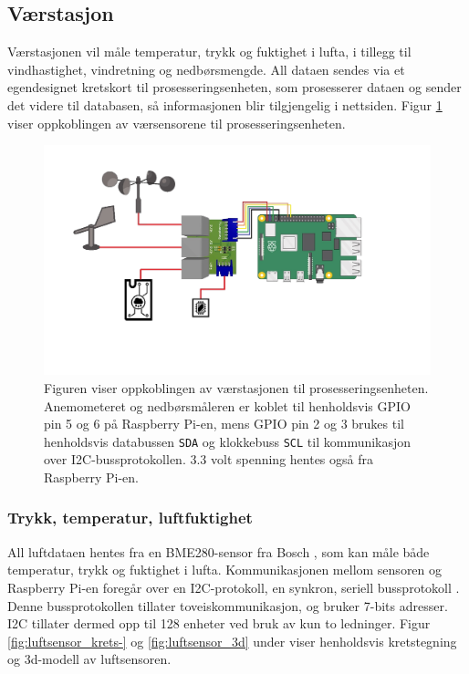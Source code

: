 \subsection{Værstasjon}\label{sec:impl:vaer}

Værstasjonen vil måle temperatur, trykk og fuktighet i lufta, i tillegg til vindhastighet, vindretning og nedbørsmengde. 
All dataen sendes via et egendesignet kretskort til prosesseringsenheten, som prosesserer dataen og sender det videre til databasen, så informasjonen blir tilgjengelig i nettsiden. 
Figur \ref{fig:kretsskjema_pi} viser oppkoblingen av værsensorene til prosesseringsenheten.

\begin{figure}[H]
    \centering
    \includegraphics[width=\textwidth]{implementering/kretsskjema_pi.png}
    \caption{Figuren viser oppkoblingen av værstasjonen til prosesseringsenheten. Anemometeret og nedbørsmåleren er koblet til henholdsvis GPIO pin 5 og 6 på Raspberry Pi-en, mens GPIO pin 2 og 3 brukes til henholdsvis databussen \texttt{SDA} og klokkebuss \texttt{SCL} til kommunikasjon over I2C-bussprotokollen. 3.3 volt spenning hentes også fra Raspberry Pi-en.}
    \label{fig:kretsskjema_pi}
\end{figure}


\subsubsection{Trykk, temperatur, luftfuktighet}\label{sec:impl:vaer:ttl}

All luftdataen hentes fra en BME280-sensor fra Bosch \cite{bme280}, som kan måle både temperatur, trykk og fuktighet i lufta. 
Kommunikasjonen mellom sensoren og Raspberry Pi-en foregår over en I2C-protokoll, en synkron, seriell bussprotokoll \cite{i2c}. 
Denne bussprotokollen tillater toveiskommunikasjon, og bruker 7-bits adresser. 
I2C tillater dermed opp til 128 enheter ved bruk av kun to ledninger. 
Figur \ref{fig:luftsensor_krets-} og \ref{fig:luftsensor_3d} under viser henholdsvis kretstegning og 3d-modell av luftsensoren.

